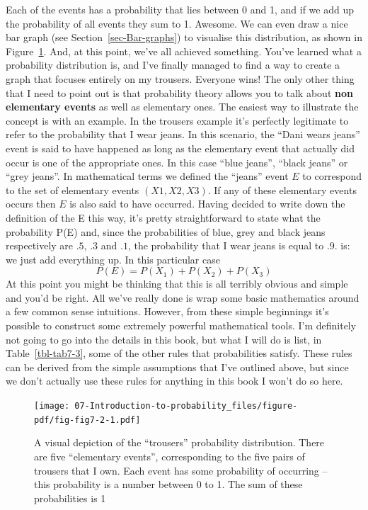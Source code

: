 \documentclass[
  a4paper,
]{book}
\begin{document}
Each of the events has a probability that lies between 0 and 1, and if
we add up the probability of all events they sum to 1. Awesome. We can
even draw a nice bar graph (see Section~\ref{sec-Bar-graphs}) to
visualise this distribution, as shown in Figure~\ref{fig-fig7-2}. And,
at this point, we've all achieved something. You've learned what a
probability distribution is, and I've finally managed to find a way to
create a graph that focuses entirely on my trousers. Everyone wins! The
only other thing that I need to point out is that probability theory
allows you to talk about \textbf{non elementary events} as well as
elementary ones. The easiest way to illustrate the concept is with an
example. In the trousers example it's perfectly legitimate to refer to
the probability that I wear jeans. In this scenario, the ``Dani wears
jeans'' event is said to have happened as long as the elementary event
that actually did occur is one of the appropriate ones. In this case
``blue jeans'', ``black jeans'' or ``grey jeans''. In mathematical terms
we defined the ``jeans'' event \(E\) to correspond to the set of
elementary events \((X1, X2, X3)\). If any of these elementary events
occurs then \(E\) is also said to have occurred. Having decided to write
down the definition of the E this way, it's pretty straightforward to
state what the probability P(E) and, since the probabilities of blue,
grey and black jeans respectively are \(.5\), \(.3\) and \(.1\), the
probability that I wear jeans is equal to \(.9\). is: we just add
everything up. In this particular case \[P(E)=P(X_1)+P(X_2)+P(X_3)\] At
this point you might be thinking that this is all terribly obvious and
simple and you'd be right. All we've really done is wrap some basic
mathematics around a few common sense intuitions. However, from these
simple beginnings it's possible to construct some extremely powerful
mathematical tools. I'm definitely not going to go into the details in
this book, but what I will do is list, in Table~\ref{tbl-tab7-3}, some
of the other rules that probabilities satisfy. These rules can be
derived from the simple assumptions that I've outlined above, but since
we don't actually use these rules for anything in this book I won't do
so here.

\begin{figure}

\texttt{[image: 07-Introduction-to-probability\_files/figure-pdf/fig-fig7-2-1.pdf]} \hfill{}

\caption{\label{fig-fig7-2}A visual depiction of the ``trousers''
probability distribution. There are five ``elementary events'',
corresponding to the five pairs of trousers that I own. Each event has
some probability of occurring -- this probability is a number between 0
to 1. The sum of these probabilities is 1}

\end{figure}
\end{document}
